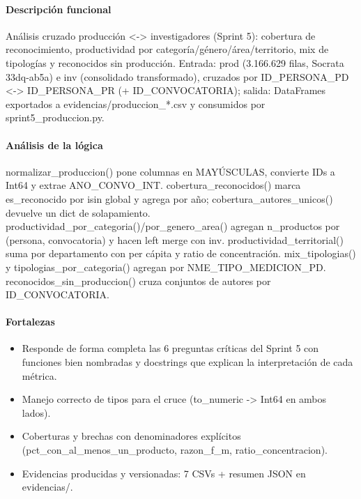 \paragraph{Descripción funcional}
Análisis cruzado producción <-> investigadores (Sprint 5): cobertura de reconocimiento, productividad por categoría/género/área/territorio, mix de tipologías y reconocidos sin producción. Entrada: prod (3.166.629 filas, Socrata 33dq-ab5a) e inv (consolidado transformado), cruzados por ID\_PERSONA\_PD <-> ID\_PERSONA\_PR (+ ID\_CONVOCATORIA); salida: DataFrames exportados a evidencias/produccion\_*.csv y consumidos por sprint5\_produccion.py.

\paragraph{Análisis de la lógica}
normalizar\_produccion() pone columnas en MAYÚSCULAS, convierte IDs a Int64 y extrae ANO\_CONVO\_INT. cobertura\_reconocidos() marca es\_reconocido por isin global y agrega por año; cobertura\_autores\_unicos() devuelve un dict de solapamiento. productividad\_por\_categoria()/por\_genero\_area() agregan n\_productos por (persona, convocatoria) y hacen left merge con inv. productividad\_territorial() suma por departamento con per cápita y ratio de concentración. mix\_tipologias() y tipologias\_por\_categoria() agregan por NME\_TIPO\_MEDICION\_PD. reconocidos\_sin\_produccion() cruza conjuntos de autores por ID\_CONVOCATORIA.

\paragraph{Fortalezas}
\begin{itemize}
  \item Responde de forma completa las 6 preguntas críticas del Sprint 5 con funciones bien nombradas y docstrings que explican la interpretación de cada métrica.
  \item Manejo correcto de tipos para el cruce (to\_numeric -> Int64 en ambos lados).
  \item Coberturas y brechas con denominadores explícitos (pct\_con\_al\_menos\_un\_producto, razon\_f\_m, ratio\_concentracion).
  \item Evidencias producidas y versionadas: 7 CSVs + resumen JSON en evidencias/.
\end{itemize}

